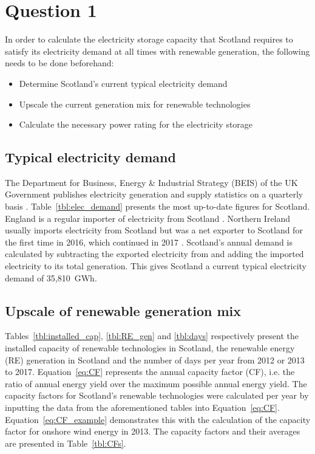 \section{Question 1}



In order to calculate the electricity storage capacity that Scotland requires to satisfy its electricity demand at all times with renewable generation, the following needs to be done beforehand:
\begin{itemize}
	\item Determine Scotland's current typical electricity demand
	\item Upscale the current generation mix for renewable technologies
	\item Calculate the necessary power rating for the electricity storage
\end{itemize}




\subsection{Typical electricity demand}

The Department for Business, Energy {\&} Industrial Strategy (BEIS) of the UK Government publishes electricity generation and supply statistics on a quarterly basis \citep{BEIS2018ElecUK}.
Table~\ref{tbl:elec_demand} presents the most up-to-date figures for Scotland.
England is a regular importer of electricity from Scotland \citep{BEIS2018EnergyTrends}.
Northern Ireland usually imports electricity from Scotland but was a net exporter to Scotland for the first time in 2016, which continued in 2017 \citep{BEIS2018EnergyTrends}.
Scotland's annual demand is calculated by subtracting the exported electricity from and adding the imported electricity to its total generation.
This gives Scotland a current typical electricity demand of 35,810~GWh.






\subsection{Upscale of renewable generation mix}

Tables~\ref{tbl:installed_cap}, \ref{tbl:RE_gen} and \ref{tbl:days} respectively present the installed capacity of renewable technologies in Scotland, the renewable energy (RE) generation in Scotland and the number of days per year from 2012 or 2013 to 2017.
Equation~\ref{eq:CF} represents the annual capacity factor (CF), i.e. the ratio of annual energy yield over the maximum possible annual energy yield.
The capacity factors for Scotland's renewable technologies were calculated per year by inputting the data from the aforementioned tables into Equation~\ref{eq:CF}.
Equation~\ref{eq:CF_example} demonstrates this with the calculation of the capacity factor for onshore wind energy in 2013.
The capacity factors and their averages are presented in Table~\ref{tbl:CFs}.

